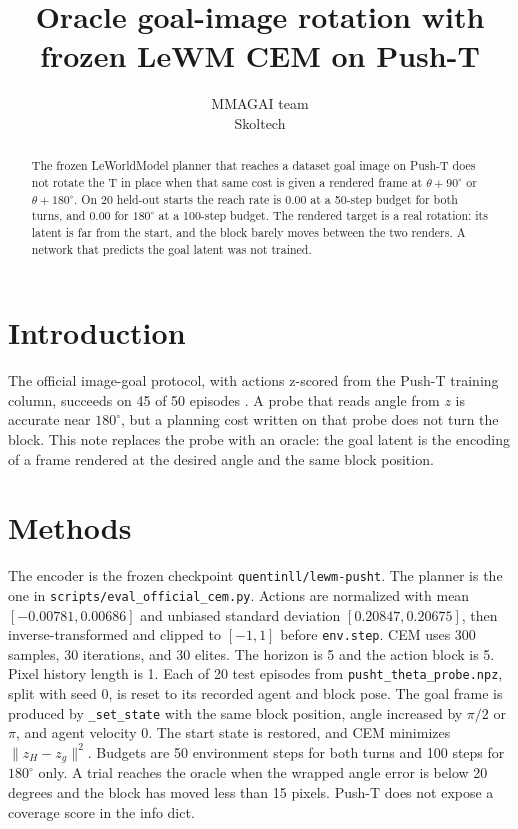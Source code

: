 \documentclass[11pt,a4paper]{article}
\title{Oracle goal-image rotation with frozen LeWM CEM on Push-T}
\author{MMAGAI team\\Skoltech}
\date{}
\begin{document}
\maketitle

\begin{abstract}
The frozen LeWorldModel planner that reaches a dataset goal image on Push-T does not rotate the T in place when that same cost is given a rendered frame at $\theta+90^{\circ}$ or $\theta+180^{\circ}$.
On 20 held-out starts the reach rate is 0.00 at a 50-step budget for both turns, and 0.00 for $180^{\circ}$ at a 100-step budget.
The rendered target is a real rotation: its latent is far from the start, and the block barely moves between the two renders.
A network that predicts the goal latent was not trained.
\end{abstract}

\section{Introduction}
The official image-goal protocol, with actions z-scored from the Push-T training column, succeeds on 45 of 50 episodes \citep{maes2026lewm}.
A probe that reads angle from $z$ is accurate near $180^{\circ}$, but a planning cost written on that probe does not turn the block.
This note replaces the probe with an oracle: the goal latent is the encoding of a frame rendered at the desired angle and the same block position.

\section{Methods}
The encoder is the frozen checkpoint \texttt{quentinll/lewm-pusht}.
The planner is the one in \texttt{scripts/eval\_official\_cem.py}.
Actions are normalized with mean $[-0.00781, 0.00686]$ and unbiased standard deviation $[0.20847, 0.20675]$, then inverse-transformed and clipped to $[-1,1]$ before \texttt{env.step}.
CEM uses 300 samples, 30 iterations, and 30 elites.
The horizon is 5 and the action block is 5.
Pixel history length is 1.
Each of 20 test episodes from \texttt{pusht\_theta\_probe.npz}, split with seed 0, is reset to its recorded agent and block pose.
The goal frame is produced by \texttt{\_set\_state} with the same block position, angle increased by $\pi/2$ or $\pi$, and agent velocity 0.
The start state is restored, and CEM minimizes $\|z_H - z_g\|^2$.
Budgets are 50 environment steps for both turns and 100 steps for $180^{\circ}$ only.
A trial reaches the oracle when the wrapped angle error is below 20 degrees and the block has moved less than 15 pixels.
Push-T does not expose a coverage score in the info dict.
\end{document}

